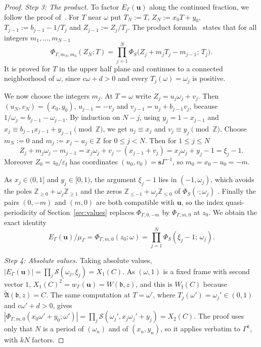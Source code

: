 \documentclass[11pt]{amsart}
\numberwithin{equation}{section}
\theoremstyle{plain}
\theoremstyle{definition}
\theoremstyle{remark}
\begin{document}
\begin{proof}
\emph{Step 3: The product.} To factor \(E_\Gamma(\mathbf u)\) along the continued fraction, we follow the proof of~\cite[Prop.~5]{RW}. For \(T\) near \(\omega\) put \(T_N:=T\), \(Z_N:=x_0T+y_0\), \(T_{j-1}:=b_{j-1}-1/T_j\) and \(Z_{j-1}:=Z_j/T_j\). The product formula~\cite[(20)]{RW} states that for all integers \(m_1,\dots,m_{N-1}\)
\[\Phi_{\Gamma,m_N,m_0}(Z_N;T)=\prod_{j=1}^N\Phi_S\bigl(Z_j+m_jT_j-m_{j-1};\,T_j\bigr).\]
It is proved for \(T\) in the upper half plane and continues to a connected neighborhood of \(\omega\), since \(c\omega+d>0\) and every \(T_j(\omega)=\omega_j\) is positive.

We now choose the integers \(m_j\). At \(T=\omega\) write \(Z_j=u_j\omega_j+v_j\). Then \((u_N,v_N)=(x_0,y_0)\), \(u_{j-1}=-v_j\) and \(v_{j-1}=u_j+b_{j-1}v_j\), because \(1/\omega_j=b_{j-1}-\omega_{j-1}\). By induction on \(N-j\), using \(y_j=1-x_{j-1}\) and \(x_j\equiv b_{j-1}x_{j-1}+y_{j-1}\pmod{\mathbb Z}\), we get \(u_j\equiv x_j\) and \(v_j\equiv y_j\pmod{\mathbb Z}\). Choose \(m_N:=0\) and \(m_j:=x_j-u_j\in\mathbb Z\) for \(0\le j<N\). Then for \(1\le j\le N\)
\[Z_j+m_j\omega_j-m_{j-1}=x_j\omega_j+v_j-(x_{j-1}+v_j)=x_j\omega_j+y_j-1=\xi_j-1 .\]
Moreover \(Z_0=z_0/\varepsilon_{\mathfrak f}\) has coordinates \((u_0,v_0)=\mathbf s\Gamma^{-1}\), so \(m_0=x_0-u_0=-m\).

As \(x_j\in(0,1]\) and \(y_j\in[0,1)\), the argument \(\xi_j-1\) lies in \((-1,\omega_j)\), which avoids the poles \(\mathbb Z_{\ge0}+\omega_j\mathbb Z_{\ge1}\) and the zeros \(\mathbb Z_{\le-1}+\omega_j\mathbb Z_{\le0}\) of \(\Phi_S(\cdot;\omega_j)\) \cite[\S2]{RW}. Finally the pairs \((0,-m)\) and \((m,0)\) are both compatible with \(\mathbf u\), so the index quasi-periodicity of Section~\ref{sec:values} replaces \(\Phi_{\Gamma,0,-m}\) by \(\Phi_{\Gamma,m,0}\) at \(z_0\). We obtain the exact identity
\begin{equation}\label{eq:exactprod}
E_\Gamma(\mathbf u)/\mu_\Gamma=\Phi_{\Gamma,m,0}(z_0;\omega)=\prod_{j=1}^N\Phi_S(\xi_j-1;\,\omega_j).
\end{equation}

\emph{Step 4: Absolute values.} Taking absolute values, \(|E_\Gamma(\mathbf u)|=\prod_j\mathcal S(\omega_j,\xi_j)=X_1(C)\). As \((\omega,1)\) is a fixed frame with second vector \(1\), \(X_1(C)^2=w_\Gamma(\mathbf u)=W(\mathfrak b,z)\), and this is \(W_{\mathfrak f}(C)\) because \(\widetilde{\mathfrak A}(\mathfrak b,z)=C\). The same computation at \(T=\omega'\), where \(T_j(\omega')=\omega_j'\in(0,1)\) and \(c\omega'+d>0\), gives \(|\Phi_{\Gamma,m,0}(x_0\omega'+y_0;\omega')|=\prod_j\mathcal S(\omega_j',x_j\omega_j'+y_j)=X_2(C)\). The proof uses only that \(N\) is a period of \((\omega_n)\) and of \((x_n,y_n)\), so it applies verbatim to \(\Gamma^k\), with \(kN\) factors.
\end{proof}
\end{document}
